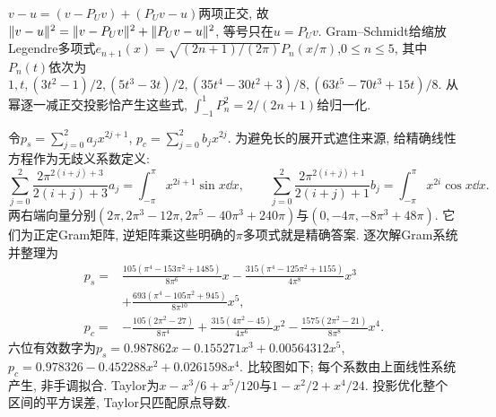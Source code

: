 \begin{solution}
$v-u=(v-P_Uv)+(P_Uv-u)$两项正交, 故$\lVert v-u\rVert^2=\lVert v-P_Uv\rVert^2+\lVert P_Uv-u\rVert^2$, 等号只在$u=P_Uv$. Gram--Schmidt给缩放Legendre多项式$e_{n+1}(x)=\sqrt{(2n+1)/(2\pi)}P_n(x/\pi)$,$0\le n\le5$, 其中$P_n(t)$依次为$1,t,(3t^2-1)/2,(5t^3-3t)/2,(35t^4-30t^2+3)/8,(63t^5-70t^3+15t)/8$. 从幂逐一减正交投影恰产生这些式, $\int_{-1}^1P_n^2=2/(2n+1)$给归一化.

令$p_s=\sum_{j=0}^2a_jx^{2j+1}$, $p_c=\sum_{j=0}^2b_jx^{2j}$. 为避免长的展开式遮住来源, 给精确线性方程作为无歧义系数定义:
\[
\sum_{j=0}^2\frac{2\pi^{2(i+j)+3}}{2(i+j)+3}a_j
=\int_{-\pi}^{\pi}x^{2i+1}\sin x\dd x,\qquad
\sum_{j=0}^2\frac{2\pi^{2(i+j)+1}}{2(i+j)+1}b_j
=\int_{-\pi}^{\pi}x^{2i}\cos x\dd x.
\]
两右端向量分别$(2\pi,2\pi^3-12\pi,2\pi^5-40\pi^3+240\pi)$与$(0,-4\pi,-8\pi^3+48\pi)$. 它们为正定Gram矩阵, 逆矩阵乘这些明确的$\pi$多项式就是精确答案. 逐次解Gram系统并整理为
\begin{align*}
p_s={}&\frac{105(\pi^4-153\pi^2+1485)}{8\pi^6}x
-\frac{315(\pi^4-125\pi^2+1155)}{4\pi^8}x^3\\
&+\frac{693(\pi^4-105\pi^2+945)}{8\pi^{10}}x^5,\\
p_c={}&-\frac{105(2\pi^2-27)}{8\pi^4}
+\frac{315(4\pi^2-45)}{4\pi^6}x^2
-\frac{1575(2\pi^2-21)}{8\pi^8}x^4.
\end{align*}
六位有效数字为$p_s=0.987862x-0.155271x^3+0.00564312x^5$,
$p_c=0.978326-0.452288x^2+0.0261598x^4$. 比较图如下; 每个系数由上面线性系统产生, 非手调拟合. Taylor为$x-x^3/6+x^5/120$与$1-x^2/2+x^4/24$. 投影优化整个区间的平方误差, Taylor只匹配原点导数.

\end{solution}
